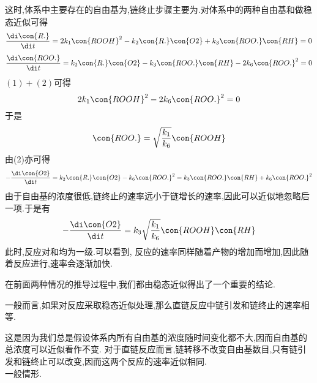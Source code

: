 \documentclass{ctexart}
\begin{document}
\begin{derivation}\setcounter{equation}{0}
    这时,体系中主要存在的自由基为,链终止步骤主要为.对体系中的两种自由基和做稳态近似可得
    \begin{equation}
        \dfrac{\di\con{R.}}{\di t}=2k_1\con{ROOH}^2-k_2\con{R.}\con{O2}+k_3\con{ROO.}\con{RH}=0
    \end{equation}
    \begin{equation}
        \dfrac{\di\con{ROO.}}{\di t}=k_2\con{R.}\con{O2}-k_3\con{ROO.}\con{RH}-2k_6\con{ROO.}^2=0
    \end{equation}
    $(1)+(2)$可得
    \begin{equation}
        2k_1\con{ROOH}^2-2k_6\con{ROO.}^2=0
    \end{equation}
    于是
    \begin{equation}
        \con{ROO.}=\sqrt{\dfrac{k_1}{k_6}}\con{ROOH}
    \end{equation}
    由(2)亦可得
    \begin{equation}
        -\dfrac{\di\con{O2}}{\di t}=k_2\con{R.}\con{O2}-k_6\con{ROO.}^2=k_3\con{ROO.}\con{RH}+k_6\con{ROO.}^2
    \end{equation}
    由于自由基的浓度很低,链终止的速率远小于链增长的速率,因此可以近似地忽略后一项.于是有
    \begin{equation}
        -\dfrac{\di\con{O2}}{\di t}=k_3\sqrt{\dfrac{k_1}{k_6}}\con{ROOH}\con{RH}
    \end{equation}
    此时,反应对和均为一级.可以看到,%
    反应的速率同样随着产物的增加而增加,因此随着反应进行,速率会逐渐加快.
\end{derivation}
在前面两种情况的推导过程中,我们都由稳态近似得出了一个重要的结论.
\begin{theorem}[7D.1.4 直链反应的性质]
    一般而言,如果对反应采取稳态近似处理,那么直链反应中链引发和链终止的速率相等.
\end{theorem}
这是因为我们总是假设体系内所有自由基的浓度随时间变化都不大,因而自由基的总浓度可以近似看作不变.%
对于直链反应而言,链转移不改变自由基数目,只有链引发和链终止可以改变,因而这两个反应的速率近似相同.\\
\indent {}一般情形.
\end{document}
